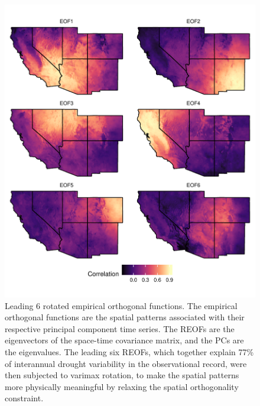 \documentclass[11pt]{wlscirep}
\begin{document}
\begin{figure}[p!]
\centering
\includegraphics[width=.9\linewidth]{figures/reof_observed.pdf}
\caption{Leading 6 rotated empirical orthogonal functions. The empirical orthogonal functions are the spatial patterns associated with their respective principal component time series. The REOFs are the eigenvectors of the space-time covariance matrix, and the PCs are the eigenvalues. The leading six REOFs, which together explain 77\% of interannual drought variability in the observational record, were then subjected to varimax rotation, to make the spatial patterns more physically meaningful by relaxing the spatial orthogonality constraint.}
\label{fig:eofs}
\end{figure}
\end{document}
